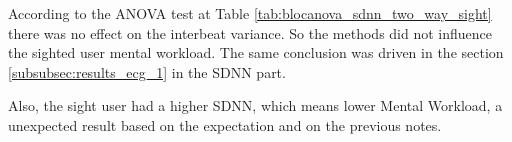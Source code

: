 %
%

According to the ANOVA test at Table \ref{tab:blocanova_sdnn_two_way_sight} there was no effect on the interbeat variance. So the methods did not influence the sighted user mental workload. The same conclusion was driven in the section \ref{subsubsec:results_ecg_1} in the SDNN part.

Also, the sight user had a higher SDNN, which means lower Mental Workload, a unexpected result based on the expectation and on the previous notes. 

\FloatBarrier